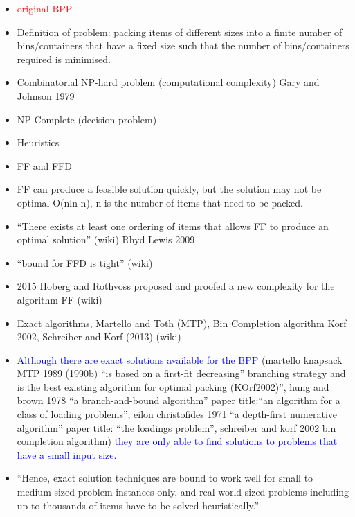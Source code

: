 \documentclass[oribibl]{llncs}
\begin{document}
\begin{itemize}
	\item \textcolor{red}{original BPP}
	\item Definition of problem: packing items of different sizes into a finite number of bins/containers that have a fixed size such that the number of bins/containers required is minimised.
	\item Combinatorial NP-hard problem (computational complexity) Gary and Johnson 1979
	\item NP-Complete (decision problem)
	\item Heuristics
	\item FF and FFD
	\item FF can produce a feasible solution quickly, but the solution may not be optimal O(nln n), n is the number of items that need to be packed.
	\item ``There exists at least one ordering of items that allows FF to produce an optimal solution'' (wiki) Rhyd Lewis 2009
	\item ``bound for FFD is tight'' (wiki)
	\item 2015 Hoberg and Rothvoss proposed and proofed a new complexity for the algorithm FF (wiki)
	\item Exact algorithms, Martello and Toth (MTP), Bin Completion algorithm Korf 2002, Schreiber and Korf (2013) (wiki)
	\item \textcolor{blue}{Although there are exact solutions available for the BPP} (martello knapsack MTP 1989 (1990b) ``is based on a first-fit decreasing'' branching strategy and is the best existing algorithm for optimal packing (KOrf2002)'', hung and brown 1978 ``a branch-and-bound algorithm'' paper title:``an algorithm for a class of loading problems'', eilon christofides 1971 ``a depth-first numerative algorithm'' paper title: ``the loadings problem'', schreiber and korf 2002 bin completion algorithm) \textcolor{blue}{they are only able to find solutions to problems that have a small input size.}
	\item ``Hence, exact solution techniques are bound to work well for small to medium sized problem instances only, and real world sized problems including up to thousands of items have to be solved heuristically.''
	

\end{itemize}
\end{document}
